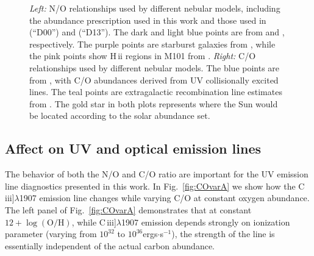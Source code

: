 \documentclass[preprint2,trackchanges]{aastex62}
\newcommand{\hii}{H\,{\sc ii}\xspace}
\newcommand{\ciii}{C\,{\sc iii}]\xspace}
\begin{document}
\begin{figure}
  \begin{center}
    \caption{\emph{Left:} N/O relationships used by different nebular models, including the abundance prescription used in this work and those used in \citet{Dopita+2000} (``D00'') and \citet{Dopita+2013} (``D13''). The dark and light blue points are from \citet{Berg+2016} and \citet{Berg+2012}, respectively. The purple points are starburst galaxies from \citet{Contini+2002}, while the pink points show \hii regions in M101 from \citet{Kennicutt+2003}. \emph{Right:} C/O relationships used by different nebular models. The blue points are from \citet{Berg+2016}, with C/O abundances derived from UV collisionally excited lines. The teal points are extragalactic recombination line estimates from \citet{Esteban+2014}. The gold star in both plots represents where the Sun would be located according to the \citet{Asplund+2009} solar abundance set.}
    \label{fig:CNO}
  \end{center}
\end{figure}

\subsection{Affect on UV and optical emission lines}

The behavior of both the N/O and C/O ratio are important for the UV emission line diagnostics presented in this work. In Fig.~\ref{fig:COvarA} we show how the \ciii$\lambda$1907 emission line changes while varying C/O at constant oxygen abundance. The left panel of Fig.~\ref{fig:COvarA} demonstrates that at constant $12 + \log (\mathrm{O}/\mathrm{H})$, while \ciii$\lambda$1907 emission depends strongly on ionization parameter (varying from $10^{32}$ to $10^{36}$ergs$\cdot$s$^{-1}$), the strength of the line is essentially independent of the actual carbon abundance. 
\end{document}
